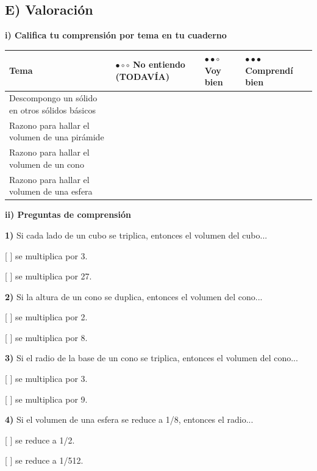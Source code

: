 \documentclass[12pt,a4paper]{article}
\begin{document}
\vspace{4mm}


\subsection*{E) Valoración}

\textbf{i) Califica tu comprensión por tema en tu cuaderno}

\begin{center}
\small
\begin{tabular}{|
		>{\centering\arraybackslash}m{5.5cm}|
		>{\centering\arraybackslash}m{2.5cm}|
		>{\centering\arraybackslash}m{2.5cm}|
		>{\centering\arraybackslash}m{2.5cm}|}
\hline
\textbf{Tema} & \textbf{$\bullet\circ\circ$ No entiendo (TODAVÍA)} & \textbf{$\bullet\bullet\circ$ Voy bien} & \textbf{$\bullet\bullet\bullet$ Comprendí bien} \\
\hline
Descompongo un sólido en otros sólidos básicos & & & \\
\hline
Razono para hallar el volumen de una pirámide & & & \\
\hline
Razono para hallar el volumen de un cono & & & \\
\hline
Razono para hallar el volumen de una esfera & & & \\
\hline
\end{tabular}
\end{center}

\textbf{ii) Preguntas de comprensión}

\textbf{1)} Si cada lado de un cubo se triplica, entonces el volumen del cubo...

[ ] se multiplica por 3.

[ ] se multiplica por 27.

\textbf{2)} Si la altura de un cono se duplica, entonces el volumen del cono...

[ ] se multiplica por 2.

[ ] se multiplica por 8.

\textbf{3)} Si el radio de la base de un cono se triplica, entonces el volumen del cono...

[ ] se multiplica por 3.

[ ] se multiplica por 9.

\textbf{4)} Si el volumen de una esfera se reduce a 1/8, entonces el radio...

[ ] se reduce a 1/2.

[ ] se reduce a 1/512.
\end{document}
